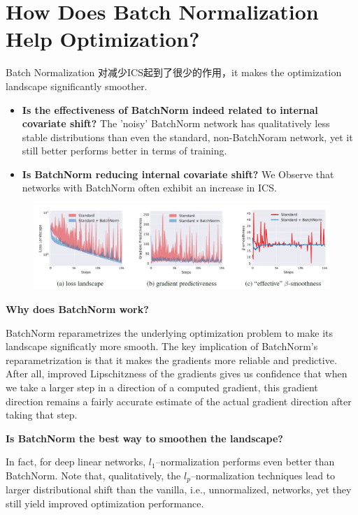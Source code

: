 \section{How Does Batch Normalization Help Optimization?}
Batch Normalization 对减少ICS起到了很少的作用，it makes the optimization landscape significantly smoother.
\begin{itemize}
    \item \textbf{Is the effectiveness of BatchNorm indeed related to internal covariate shift?} The 'noisy' BatchNorm
    network has qualitatively less stable distributions than even the standard, non-BatchNoram network, yet it still
    better performs better in terms of training.
    \item \textbf{Is BatchNorm reducing internal covariate shift?} We Observe that networks with BatchNorm often
    exhibit an increase in ICS.
\end{itemize}
\begin{figure}[H]
    \centering
    \includegraphics[width=14cm]{images/bn_landscape.png}
    \label{fig:bn_landscape}
\end{figure}

\textbf{Why does BatchNorm work?}


BatchNorm reparametrizes the underlying optimization problem to make its landscape significatly more smooth.
The key implication of BatchNorm's reparametrization is that it makes the gradients more reliable and predictive.
After all, improved Lipschitzness of the gradients gives us confidence that when we take a larger step in a direction
of a computed gradient, this gradient direction remains a fairly accurate estimate of the actual gradient direction after
taking that step.

\textbf{Is BatchNorm the best way to smoothen the landscape?}

In fact, for deep linear networks, $l_1$–normalization performs even better than BatchNorm. Note that,
qualitatively, the $l_p$–normalization techniques lead to larger distributional shift than the vanilla,
 i.e., unnormalized, networks, yet they still yield improved optimization performance.
